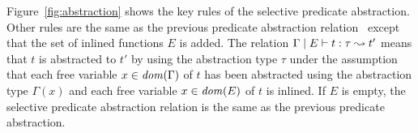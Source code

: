 
Figure~\ref{fig:abstraction} shows the key rules of the selective
predicate abstraction.  Other rules are the same as the previous
predicate abstraction relation~\cite{KobayashiPLDI2011} except that the
set of inlined functions $E$ is added.  The relation
${\Gamma} \mid {E} \vdash {t} : {\tau} \leadsto {t'}$ means that $t$ is abstracted to $t'$ by
using the abstraction type $\tau$ under the assumption that each free
variable $x \in \mathit{dom}(\Gamma)$ of $t$ has been abstracted using the
abstraction type $\Gamma(x)$ and each free variable $x \in \mathit{dom}(E)$ of
$t$ is inlined.
If $E$ is empty, the selective predicate abstraction relation is the same as the
previous predicate abstraction.

